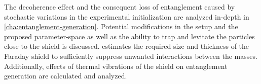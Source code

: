 The decoherence effect and the consequent loss of entanglement caused by stochastic variations in the experimental initialization are analyzed in-depth in \cref{cha:entanglement-generation}. Potential modifications in the setup and the proposed parameter-space as well as the ability to trap and levitate the particles close to the shield is discussed. 
 estimates the required size and thickness of the Faraday shield to sufficiently suppress unwanted interactions between the masses. Additionally, effects of thermal vibrations of the shield on entanglement generation are calculated and analyzed.